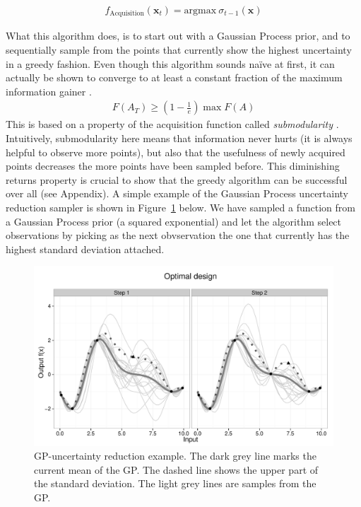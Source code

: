 \documentclass[authoryear,11pt,review]{elsarticle}
\begin{document}
\begin{align}
f_{\text{Acquisition}}(\mathbf{x}_t)= \text{argmax} ~\sigma_{t-1}(\mathbf{x})
\end{align}

What this algorithm does, is to start out with a Gaussian Process prior, and to sequentially sample from the points that currently show the highest uncertainty in a greedy fashion. Even though this algorithm sounds na\"{i}ve at first, it can actually be shown to converge to at least a constant fraction of the maximum information gainer \citep{krause2008near}.
\begin{align}
F(A_T) \geq \left(1-\frac{1}{e}\right) \max F(A)
\end{align}
This is based on a property of the acquisition function called \emph{submodularity} \citep{krause2012submodular}. Intuitively, submodularity here means that information never hurts (it is always helpful to observe more points), but also that the usefulness of newly acquired points decreases the more points have been sampled before. This diminishing returns property is crucial to show that the greedy algorithm can be successful over all (see Appendix). A simple example of the Gaussian Process uncertainty reduction sampler is shown in Figure~\ref{gpsigma} below. We have sampled a function from a Gaussian Process prior (a squared exponential) and let the algorithm select observations by picking as the next obvservation the one that currently has the highest standard deviation attached.

\begin{figure}[ht]
\caption{GP-uncertainty reduction example. The dark grey line marks the current mean of the GP. The dashed line shows the upper part of the standard deviation. The light grey lines are samples from the GP.}
\label{gpsigma}
\centering
\includegraphics[scale=0.5]{figs/optlearnexample.pdf}
\end{figure}
\end{document}
